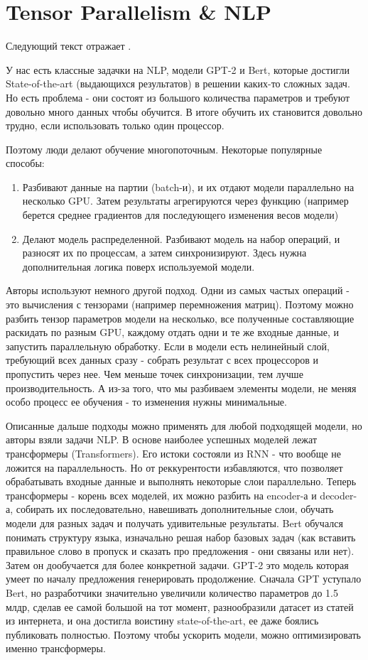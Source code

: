 \section{Tensor Parallelism & NLP}

Следующий текст отражает \cite{shoeybi2019megatron}.

У нас есть классные задачки на NLP, модели GPT-2 и Bert, которые достигли State-of-the-art (выдающихся результатов) в решении каких-то сложных задач. Но есть проблема - они состоят из большого количества параметров и требуют довольно много данных чтобы обучится. В итоге обучить их становится довольно трудно, если использовать только один процессор.

Поэтому люди делают обучение многопоточным. Некоторые популярные способы: 
\begin{enumerate}
    \item Разбивают данные на партии (batch-и), и их отдают модели параллельно на несколько GPU. Затем результаты агрегируются через функцию (например берется среднее градиентов для последующего изменения весов модели)
    \item  Делают модель распределенной. Разбивают модель на набор операций, и разносят их по процессам, а затем синхронизируют. Здесь нужна дополнительная логика поверх используемой модели. 
\end{enumerate}
Авторы используют немного другой подход. Одни из самых частых операций - это вычисления с тензорами (например перемножения матриц). Поэтому можно разбить тензор параметров модели на несколько, все полученные составляющие раскидать по разным GPU, каждому отдать одни и те же входные данные, и запустить параллельную обработку. Если в модели есть нелинейный слой, требующий всех данных сразу - собрать результат с всех процессоров и пропустить через нее. Чем меньше точек синхронизации, тем лучше производительность. А из-за того, что мы разбиваем элементы модели, не меняя особо процесс ее обучения - то изменения нужны минимальные.

Описанные дальше подходы можно применять для любой подходящей модели, но авторы взяли задачи NLP. В основе наиболее успешных моделей лежат трансформеры (Transformers). Его истоки состояли из RNN - что вообще не ложится на параллельность. Но \cite{vaswani2017attention} от реккурентости избавляются, что позволяет обрабатывать входные данные и выполнять некоторые слои параллельно. Теперь трансформеры - корень всех моделей, их можно разбить на encoder-а и decoder-а, собирать их последовательно, навешивать дополнительные слои, обучать модели для разных задач и получать удивительные результаты. Bert обучался понимать структуру языка, изначально решая набор базовых задач (как вставить правильное слово в пропуск и сказать про предложения - они связаны или нет). Затем он дообучается для более конкретной задачи. GPT-2 это модель которая умеет по началу предложения генерировать продолжение. Сначала GPT уступало Bert, но разработчики значительно увеличили количество параметров до 1.5 млдр, сделав ее самой большой на тот момент, разнообразили датасет из статей из интернета, и она достигла воистину state-of-the-art, ее даже боялись публиковать полностью. Поэтому чтобы ускорить модели, можно оптимизировать именно трансформеры.

